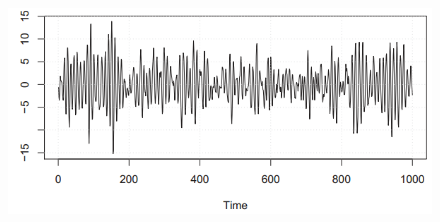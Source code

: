 {\begin{figure}[H]
\begin{minipage}[c]{0.5\textwidth}
		\label{Fig:whNoMA}
	\end{minipage}\hfill
	\begin{minipage}[c]{0.5\textwidth}
		\includegraphics[width=1\linewidth]{images/whNoAR.png}
		\label{Fig:whNoAR}
	\end{minipage}
\end{figure}
}
